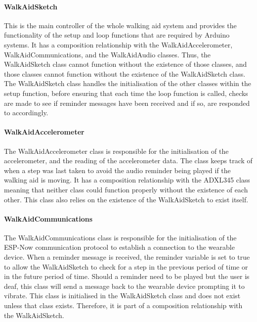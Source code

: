                 \clearpage
                \thispagestyle{empty}
                \begin{landscape}
                    
                \end{landscape}

                \paragraph{WalkAidSketch}\mbox{}

                    This is the main controller of the whole walking aid system and provides the functionality of the setup and loop functions that are required by Arduino systems. It has a composition relationship with the WalkAidAccelerometer, WalkAidCommunications, and the WalkAidAudio classes. Thus, the WalkAidSketch class cannot function without the existence of those classes, and those classes cannot function without the existence of the WalkAidSketch class. The WalkAidSketch class handles the initialisation of the other classes within the setup function, before ensuring that each time the loop function is called, checks are made to see if reminder messages have been received and if so, are responded to accordingly.

                \paragraph{WalkAidAccelerometer}\mbox{}

                    The WalkAidAccelerometer class is responsible for the initialisation of the accelerometer, and the reading of the accelerometer data. The class keeps track of when a step was last taken to avoid the audio reminder being played if the walking aid is moving. It has a composition relationship with the ADXL345 class meaning that neither class could function properly without the existence of each other. This class also relies on the existence of the WalkAidSketch to exist itself.

                \paragraph{WalkAidCommunications}\mbox{}

                    The WalkAidCommunications class is responsible for the initialisation of the ESP-Now communication protocol to establish a connection to the wearable device. When a reminder message is received, the reminder variable is set to true to allow the WalkAidSketch to check for a step in the previous period of time or in the future period of time. Should a reminder need to be played but the user is deaf, this class will send a message back to the wearable device prompting it to vibrate. This class is initialised in the WalkAidSketch class and does not exist unless that class exists. Therefore, it is part of a composition relationship with the WalkAidSketch.

